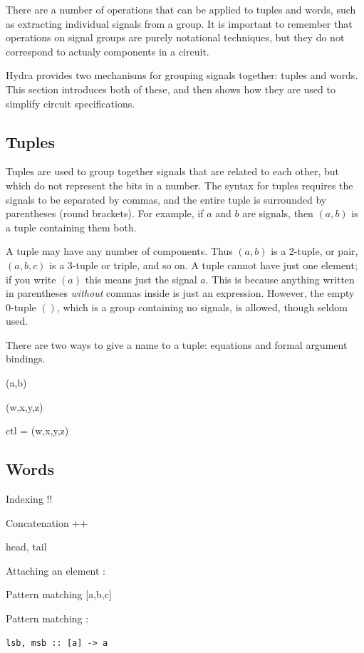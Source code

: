 \documentclass[a4paper,openany,fleqn]{book}
\begin{document}
There are a number of operations that can be applied to tuples and
words, such as extracting individual signals from a group.  It is
important to remember that operations on signal groups are purely
notational techniques, but they do not correspond to actualy
components in a circuit.

Hydra provides two mechanisms for grouping signals together: tuples
and words.  This section introduces both of these, and then shows how
they are used to simplify circuit specifications.

\subsection{Tuples}
\label{sec:tuples}

Tuples are used to group together signals that are related to each
other, but which do not represent the bits in a number.  The syntax
for tuples requires the signals to be separated by commas, and the
entire tuple is surrounded by parentheses (round brackets).  For
example, if $a$ and $b$ are signals, then $(a,b)$ is a tuple
containing them both.

A tuple may have any number of components.  Thus $(a,b)$ is a 2-tuple,
or pair, $(a,b,c)$ is a 3-tuple or triple, and so on.  A tuple cannot
have just one element; if you write $(a)$ this means just the signal
$a$.  This is because anything written in parentheses \emph{without}
commas inside is just an expression.  However, the empty 0-tuple $()$,
which is a group containing no signals, is allowed, though seldom
used.

There are two ways to give a name to a tuple: equations and formal
argument bindings.

(a,b)

(w,x,y,z)

ctl = (w,x,y,z)

\subsection{Words}
\label{sec:words}

Indexing !!

Concatenation ++

head, tail

Attaching an element :

Pattern matching [a,b,c]

Pattern matching :

\begin{verbatim}
lsb, msb :: [a] -> a
\end{verbatim}
\end{document}
